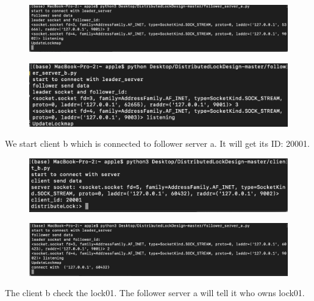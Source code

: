 \documentclass[10pt]{article}
\begin{document}
\begin{figure}[H]
\centerline{\includegraphics[width = 1\textwidth]{screenshot//follower_a_02.png}}
\end{figure}

\begin{figure}[H]
\centerline{\includegraphics[width = 1\textwidth]{screenshot//follower_b_02.png}}
\end{figure}


We start client b which is connected to follower server a. It will get its ID: 20001.

\begin{figure}[H]
\centerline{\includegraphics[width = 1\textwidth]{screenshot//client_03.png}}
\end{figure}

\begin{figure}[H]
\centerline{\includegraphics[width = 1\textwidth]{screenshot//follower_a_03.png}}
\end{figure}

The client b check the lock01. The follower server a will tell it who owns lock01.
\end{document}
